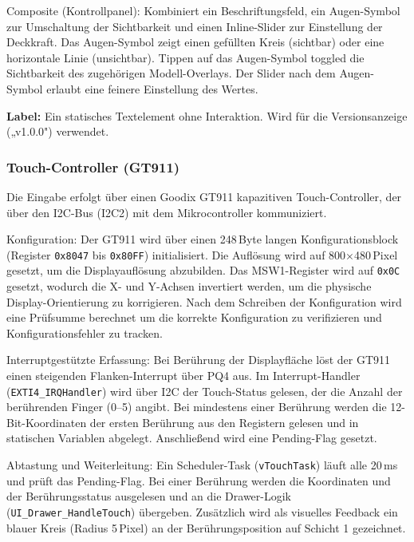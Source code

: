 Composite (Kontrollpanel): Kombiniert ein Beschriftungsfeld, ein Augen-Symbol zur Umschaltung der Sichtbarkeit und einen Inline-Slider zur Einstellung der Deckkraft. Das Augen-Symbol zeigt einen gefüllten Kreis (sichtbar) oder eine horizontale Linie (unsichtbar). Tippen auf das Augen-Symbol toggled die Sichtbarkeit des zugehörigen Modell-Overlays. Der Slider nach dem Augen-Symbol erlaubt eine feinere Einstellung des Wertes.

\textbf{Label:} Ein statisches Textelement ohne Interaktion. Wird für die Versionsanzeige („v1.0.0") verwendet.

\subsubsection{Touch-Controller (GT911)}\label{ssub:touch-controller}

Die Eingabe erfolgt über einen Goodix GT911 kapazitiven Touch-Controller, der über den I2C-Bus (I2C2) mit dem Mikrocontroller kommuniziert.

Konfiguration: Der GT911 wird über einen 248\,Byte langen Konfigurationsblock (Register \linebreak \texttt{0x8047} bis \texttt{0x80FF}) initialisiert. Die Auflösung wird auf 800$\times$480\,Pixel gesetzt, um die Displayauflösung abzubilden. Das MSW1-Register wird auf \texttt{0x0C} gesetzt, wodurch die X- und Y-Achsen invertiert werden, um die physische Display-Orientierung zu korrigieren. Nach dem Schreiben der Konfiguration wird eine Prüfsumme berechnet um die korrekte Konfiguration zu verifizieren und Konfigurationsfehler zu tracken.

Interruptgestützte Erfassung: Bei Berührung der Displayfläche löst der GT911 einen steigenden Flanken-Interrupt über PQ4 aus. Im Interrupt-Handler (\texttt{EXTI4\_IRQHandler}) wird über I2C der Touch-Status gelesen, der die Anzahl der berührenden Finger (0--5) angibt. Bei mindestens einer Berührung werden die 12-Bit-Koordinaten der ersten Berührung aus den Registern gelesen und in statischen Variablen abgelegt. Anschließend wird eine Pending-Flag gesetzt.

Abtastung und Weiterleitung: Ein Scheduler-Task (\texttt{vTouchTask}) läuft alle 20\,ms und prüft das Pending-Flag. Bei einer Berührung werden die Koordinaten und der Berührungsstatus ausgelesen und an die Drawer-Logik (\texttt{UI\_Drawer\_HandleTouch}) übergeben. Zusätzlich wird als visuelles Feedback ein blauer Kreis (Radius 5\,Pixel) an der Berührungsposition auf Schicht 1 gezeichnet.

